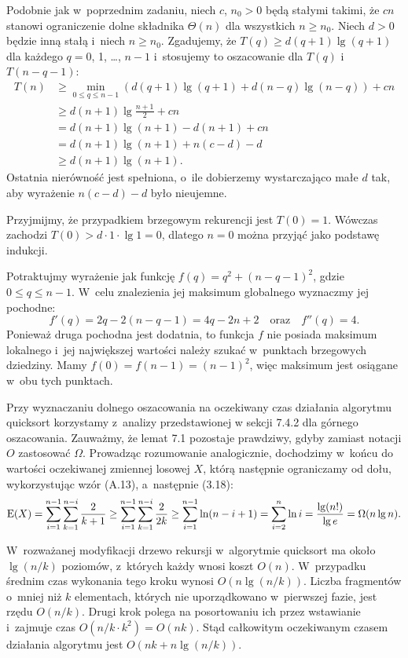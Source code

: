 Podobnie jak w~poprzednim zadaniu, niech $c$, $n_0>0$ będą stałymi takimi, że $cn$ stanowi ograniczenie dolne składnika $\Theta(n)$ dla wszystkich $n\ge n_0$.
Niech $d>0$ będzie inną stałą i~niech $n\ge n_0$.
Zgadujemy, że $T(q)\ge d(q+1)\lg(q+1)$ dla każdego $q=0$, 1, \dots, $n-1$ i~stosujemy to oszacowanie dla $T(q)$ i~$T(n-q-1)$:
\begin{align*}
    T(n) &\ge \min_{0\le q\le n-1}(d(q+1)\lg(q+1)+d(n-q)\lg(n-q))+cn \\
    &\ge d(n+1)\lg\frac{n+1}{2}+cn \\
	&= d(n+1)\lg(n+1)-d(n+1)+cn \\
	&= d(n+1)\lg(n+1)+n(c-d)-d \\
	&\ge d(n+1)\lg(n+1).
\end{align*}
Ostatnia nierówność jest spełniona, o~ile dobierzemy wystarczająco małe $d$ tak, aby wyrażenie $n(c-d)-d$ było nieujemne.

Przyjmijmy, że przypadkiem brzegowym rekurencji jest $T(0)=1$.
Wówczas zachodzi $T(0)>d\cdot1\cdot\lg1=0$, dlatego $n=0$ można przyjąć jako podstawę indukcji.

\exercise %
Potraktujmy wyrażenie jak funkcję $f(q)=q^2+(n-q-1)^2$, gdzie $0\le q\le n-1$.
W~celu znalezienia jej maksimum globalnego wyznaczmy jej pochodne:
\[
    f'(q) = 2q-2(n-q-1) = 4q-2n+2 \quad\text{oraz}\quad f''(q) = 4.
\]
Ponieważ druga pochodna jest dodatnia, to funkcja $f$ nie posiada maksimum lokalnego i~jej największej wartości należy szukać w~punktach brzegowych dziedziny.
Mamy $f(0)=f(n-1)=(n-1)^2$, więc maksimum jest osiągane w~obu tych punktach.

\exercise %
Przy wyznaczaniu dolnego oszacowania na oczekiwany czas działania algorytmu quicksort korzystamy z~analizy przedstawionej w sekcji 7.4.2 dla górnego oszacowania.
Zauważmy, że lemat 7.1 pozostaje prawdziwy, gdyby zamiast notacji $O$ zastosować $\Omega$.
Prowadząc rozumowanie analogicznie, dochodzimy w~końcu do wartości oczekiwanej zmiennej losowej $X$, którą następnie ograniczamy od dołu, wykorzystując wzór (A.13), a~następnie (3.18):
\[
	\operatorname{E}(X) = \sum_{i=1}^{n-1}\sum_{k=1}^{n-i}\frac{2}{k+1} \ge \sum_{i=1}^{n-1}\sum_{k=1}^{n-i}\frac{2}{2k} \ge \sum_{i=1}^{n-1}\ln(n-i+1) = \sum_{i=2}^n\ln i = \frac{\lg(n!)}{\lg e} = \Omega(n\lg n).
\]

\exercise %
W~rozważanej modyfikacji drzewo rekursji w~algorytmie quicksort ma około $\lg(n/k)$ poziomów, z~których każdy wnosi koszt $O(n)$.
W~przypadku średnim czas wykonania tego kroku wynosi $O(n\lg(n/k))$.
Liczba fragmentów o~mniej niż $k$ elementach, których nie uporządkowano w~pierwszej fazie, jest rzędu $O(n/k)$.
Drugi krok polega na posortowaniu ich przez wstawianie i~zajmuje czas $O(n/k\cdot k^2)=O(nk)$.
Stąd całkowitym oczekiwanym czasem działania algorytmu jest $O(nk+n\lg(n/k))$.

